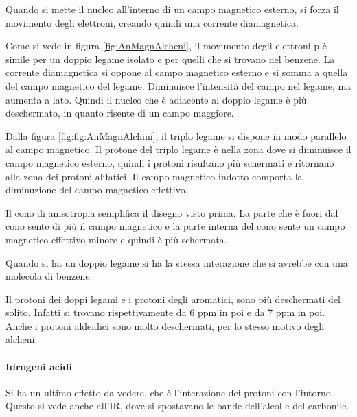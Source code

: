 Quando si mette il nucleo all'interno di un campo magnetico esterno, si
forza il movimento degli elettroni, creando quindi una corrente diamagnetica.


Come si vede in figura \ref{fig:AnMagnAlcheni}, il movimento degli elettroni p è simile per un doppio legame isolato e
per quelli che si trovano nel benzene. La corrente diamagnetica si
oppone al campo magnetico esterno e si somma a quella del campo
magnetico del legame. Diminuisce l'intensità del campo nel legame, ma
aumenta a lato. Quindi il nucleo che è adiacente al doppio
legame è più deschermato, in quanto risente di un campo maggiore.


Dalla figura \ref{fig:fig:AnMagnAlchini}, il triplo legame si dispone in modo parallelo al campo magnetico. Il protone del triplo legame è nella zona dove si diminuisce il campo
magnetico esterno, quindi i protoni risultano più schermati e ritornano
alla zona dei protoni alifatici.
Il campo magnetico indotto comporta la diminuzione del campo magnetico
effettivo.


Il cono di anisotropia semplifica il disegno visto prima. La parte che è
fuori dal cono sente di più il campo magnetico e la parte interna del
cono sente un campo magnetico effettivo minore e quindi è più schermata.

Quando si ha un doppio legame si ha la stessa interazione che si avrebbe
con una molecola di benzene.


Il protoni dei doppi legami e i protoni degli aromatici, sono più
deschermati del solito. Infatti si trovano rispettivamente da 6 ppm in
poi e da 7 ppm in poi.
Anche i protoni aldeidici sono molto deschermati, per lo stesso motivo
degli alcheni.

\paragraph{Idrogeni acidi}
Si ha un ultimo effetto da vedere, che è l'interazione dei protoni con
l'intorno. Questo si vede anche all'IR, dove si spostavano le bande
dell'alcol e del carbonile.

